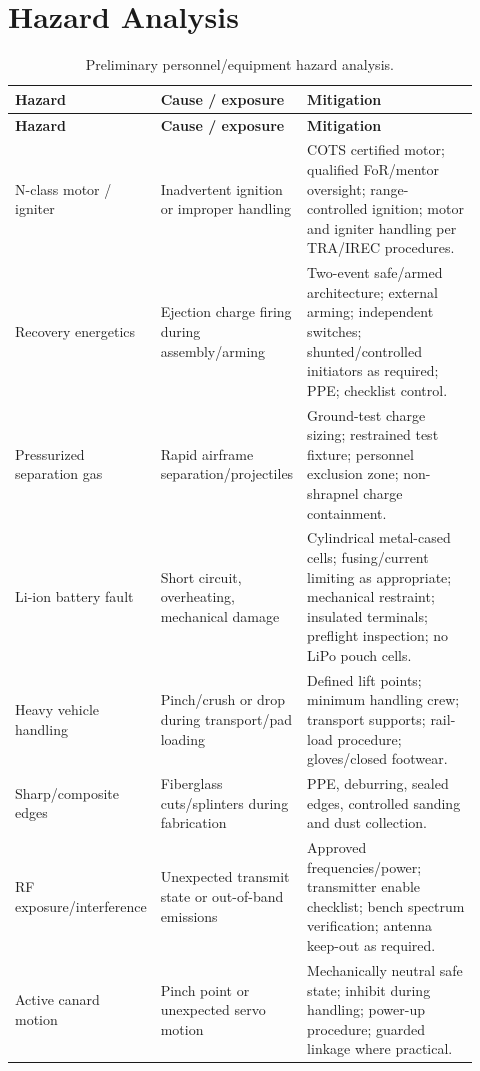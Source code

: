 \documentclass[10pt]{article}
\begin{document}
\section{Hazard Analysis}
\begin{longtable}{@{}p{0.22\linewidth}p{0.31\linewidth}p{0.39\linewidth}@{}}
\caption{Preliminary personnel/equipment hazard analysis.}\\
\toprule
\textbf{Hazard} & \textbf{Cause / exposure} & \textbf{Mitigation} \\
\midrule
\endfirsthead
\toprule
\textbf{Hazard} & \textbf{Cause / exposure} & \textbf{Mitigation} \\
\midrule
\endhead
N-class motor / igniter & Inadvertent ignition or improper handling & COTS certified motor; qualified FoR/mentor oversight; range-controlled ignition; motor and igniter handling per TRA/IREC procedures. \\
Recovery energetics & Ejection charge firing during assembly/arming & Two-event safe/armed architecture; external arming; independent switches; shunted/controlled initiators as required; PPE; checklist control. \\
Pressurized separation gas & Rapid airframe separation/projectiles & Ground-test charge sizing; restrained test fixture; personnel exclusion zone; non-shrapnel charge containment. \\
Li-ion battery fault & Short circuit, overheating, mechanical damage & Cylindrical metal-cased cells; fusing/current limiting as appropriate; mechanical restraint; insulated terminals; preflight inspection; no LiPo pouch cells. \\
Heavy vehicle handling & Pinch/crush or drop during transport/pad loading & Defined lift points; minimum handling crew; transport supports; rail-load procedure; gloves/closed footwear. \\
Sharp/composite edges & Fiberglass cuts/splinters during fabrication & PPE, deburring, sealed edges, controlled sanding and dust collection. \\
RF exposure/interference & Unexpected transmit state or out-of-band emissions & Approved frequencies/power; transmitter enable checklist; bench spectrum verification; antenna keep-out as required. \\
Active canard motion & Pinch point or unexpected servo motion & Mechanically neutral safe state; inhibit during handling; power-up procedure; guarded linkage where practical. \\
\bottomrule
\end{longtable}
\end{document}
